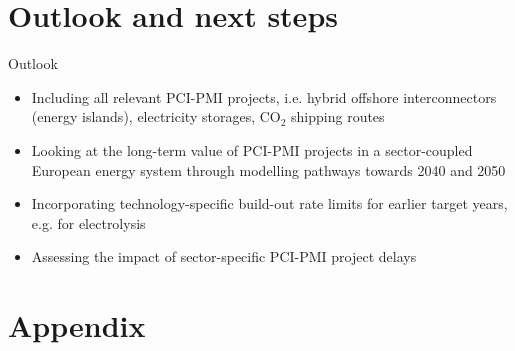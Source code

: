 \documentclass[10pt,aspectratio=169,dvipsnames]{beamer}
\begin{document}
\section{Outlook and next steps}
\begin{frame}{Outlook}
  \footnotesize
  \begin{itemize}
    \item Including \alert{all relevant PCI-PMI projects}, i.e. hybrid offshore interconnectors (energy islands), electricity storages, CO$_2$ shipping routes
    \item Looking at the \alert{long-term value of PCI-PMI projects} in a sector-coupled European energy system through modelling pathways towards 2040 and 2050
    \item Incorporating technology-specific \alert{build-out rate limits} for earlier target years, e.g. for electrolysis
    \item Assessing the impact of \alert{sector-specific} PCI-PMI project delays
  \end{itemize}
\end{frame}
\begin{frame}
  \centering
\end{frame}

\section{Appendix}
\end{document}
